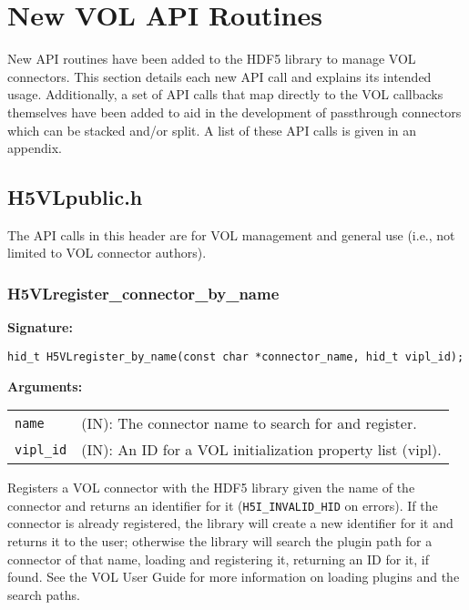 \section{New VOL API Routines}
\label{sec:api}
New API routines have been added to the HDF5 library to manage VOL connectors. This section details each new API call and explains its intended usage. Additionally, a set of API calls that map directly to the VOL callbacks themselves have been added to aid in the development of passthrough connectors which can be stacked and/or split. A list of these API calls is given in an appendix.

\bigskip

\subsection{H5VLpublic.h}

The API calls in this header are for VOL management and general use (i.e., not
limited to VOL connector authors).

\subsubsection{H5VLregister\_connector\_by\_name}
\begin{mdframed}[style=bgbox]
\textbf{Signature:}
\begin{lstlisting}
hid_t H5VLregister_by_name(const char *connector_name, hid_t vipl_id);
\end{lstlisting}
\textbf{Arguments:}\\
\begin{tabular}{l p{13.5cm}}
  {\tt name} & (IN): The connector name to search for and register.\\
  {\tt vipl\_id} & (IN): An ID for a VOL initialization property list (vipl).\\
\end{tabular}
\end{mdframed}
Registers a VOL connector with the HDF5 library given the name of the connector and returns an identifier for it (\texttt{H5I\_INVALID\_HID} on errors). If the connector is already registered, the library will create a new identifier for it and returns it to the user; otherwise the library will search the plugin path for a connector of that name, loading and registering it, returning an ID for it, if found. See the VOL User Guide for more information on loading plugins and the search paths.
\bigskip


